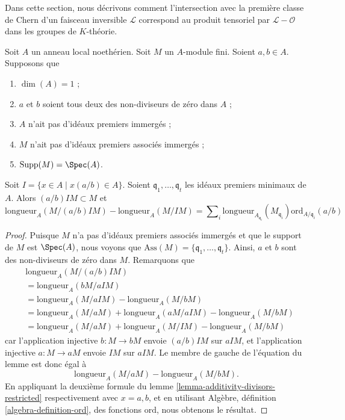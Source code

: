 \noindent
Dans cette section, nous décrivons comment l'intersection avec la
première classe de Chern d'un faisceau inversible $\mathcal{L}$
correspond au produit tensoriel par $\mathcal{L} - \mathcal{O}$
dans les groupes de $K$-théorie.

\begin{lemma}
\label{lemma-no-embedded-points-modules}
Soit $A$ un anneau local noethérien.
Soit $M$ un $A$-module fini.
Soient $a, b \in A$.
Supposons que
\begin{enumerate}
\item $\dim(A) = 1$ ;
\item $a$ et $b$ soient tous deux des non-diviseurs de zéro dans $A$ ;
\item $A$ n'ait pas d'idéaux premiers immergés ;
\item $M$ n'ait pas d'idéaux premiers associés immergés ;
\item $\text{Supp}(M) = \Spec(A)$.
\end{enumerate}
Soit $I = \{x \in A \mid x(a/b) \in A\}$.
Soient $\mathfrak q_1, \ldots, \mathfrak q_t$ les idéaux premiers minimaux
de $A$. Alors $(a/b)IM \subset M$ et
$$
\text{longueur}_A(M/(a/b)IM)
-
\text{longueur}_A(M/IM)
=
\sum\nolimits_i
\text{longueur}_{A_{\mathfrak q_i}}(M_{\mathfrak q_i})
\text{ord}_{A/\mathfrak q_i}(a/b)
$$
\end{lemma}

\begin{proof}
Puisque $M$ n'a pas d'idéaux premiers associés immergés et que
le support de $M$ est $\Spec(A)$, nous voyons que
$\text{Ass}(M) = \{\mathfrak q_1, \ldots, \mathfrak q_t\}$.
Ainsi, $a$ et $b$ sont des non-diviseurs de zéro dans $M$. Remarquons que
\begin{align*}
& \text{longueur}_A(M/(a/b)IM) \\
& = \text{longueur}_A(bM/aIM) \\
& = \text{longueur}_A(M/aIM)
-
\text{longueur}_A(M/bM) \\
& = \text{longueur}_A(M/aM) + \text{longueur}_A(aM/aIM) - \text{longueur}_A(M/bM) \\
& = \text{longueur}_A(M/aM) + \text{longueur}_A(M/IM) - \text{longueur}_A(M/bM)
\end{align*}
car l'application injective $b : M \to bM$ envoie $(a/b)IM$ sur $aIM$,
et l'application injective $a : M \to aM$ envoie $IM$ sur $aIM$.
Le membre de gauche de l'équation du lemme est donc
égal à
$$
\text{longueur}_A(M/aM) - \text{longueur}_A(M/bM).
$$
En appliquant la deuxième formule du
lemme \ref{lemma-additivity-divisors-restricted}
respectivement avec $x = a, b$,
et en utilisant Algèbre, définition \ref{algebra-definition-ord},
des fonctions $\text{ord}$, nous obtenons le résultat.
\end{proof}

